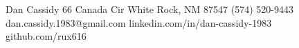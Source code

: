 
Dan Cassidy
66 Canada Cir
White Rock, NM 87547
(574) 520-9443
dan.cassidy.1983@gmail.com
linkedin.com/in/dan-cassidy-1983
github.com/rux616

